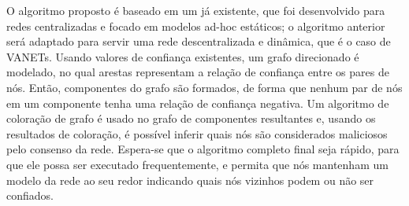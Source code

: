 \begin{resumo}
O algoritmo proposto é baseado em um já existente, que foi desenvolvido para redes centralizadas e focado em modelos ad-hoc estáticos; o algoritmo anterior será adaptado para servir uma rede descentralizada e dinâmica, que é o caso de VANETs.
Usando valores de confiança existentes, um grafo direcionado é modelado, no qual arestas representam a relação de confiança entre os pares de nós.
Então, componentes do grafo são formados, de forma que nenhum par de nós em um componente tenha uma relação de confiança negativa.
Um algoritmo de coloração de grafo é usado no grafo de componentes resultantes e, usando os resultados de coloração, é possível inferir quais nós são considerados maliciosos pelo consenso da rede.
Espera-se que o algoritmo completo final seja rápido, para que ele possa ser executado frequentemente, e permita que nós mantenham um modelo da rede ao seu redor indicando quais nós vizinhos podem ou não ser confiados.

\end{resumo}


